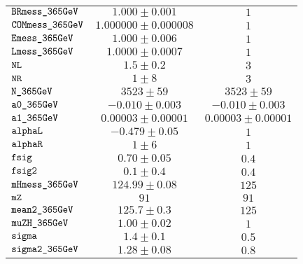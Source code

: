 \begin{tabular}{lcc}
$\verb+BRmess_365GeV+ $ & $  1.000\pm 0.001$ & $ 1$\\
$\verb+COMmess_365GeV+ $ & $  1.000000\pm 0.000008$ & $ 1$\\
$\verb+Emess_365GeV+ $ & $  1.000\pm 0.006$ & $ 1$\\
$\verb+Lmess_365GeV+ $ & $  1.0000\pm 0.0007$ & $ 1$\\
$\verb+NL+ $ & $  1.5\pm 0.2$ & $ 3$\\
$\verb+NR+ $ & $  1\pm 8$ & $ 3$\\
$\verb+N_365GeV+ $ & $  3523\pm 59$ & $ 3523\pm 59$\\
$\verb+a0_365GeV+ $ & $ -0.010\pm 0.003$ & $-0.010\pm 0.003$\\
$\verb+a1_365GeV+ $ & $  0.00003\pm 0.00001$ & $ 0.00003\pm 0.00001$\\
$\verb+alphaL+ $ & $ -0.479\pm 0.05$ & $ 1$\\
$\verb+alphaR+ $ & $  1\pm 6$ & $ 1$\\
$\verb+fsig+ $ & $  0.70\pm 0.05$ & $ 0.4$\\
$\verb+fsig2+ $ & $  0.1\pm 0.4$ & $ 0.4$\\
$\verb+mHmess_365GeV+ $ & $  124.99\pm 0.08$ & $ 125$\\
$\verb+mZ+ $ & $  91$ & $ 91$\\
$\verb+mean2_365GeV+ $ & $  125.7\pm 0.3$ & $ 125$\\
$\verb+muZH_365GeV+ $ & $  1.00\pm 0.02$ & $ 1$\\
$\verb+sigma+ $ & $  1.4\pm 0.1$ & $ 0.5$\\
$\verb+sigma2_365GeV+ $ & $  1.28\pm 0.08$ & $ 0.8$\\
\end{tabular}
